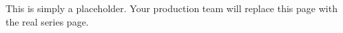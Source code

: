\thispagestyle{empty}
This is simply a placeholder. Your production team will replace this page with the real series page. 